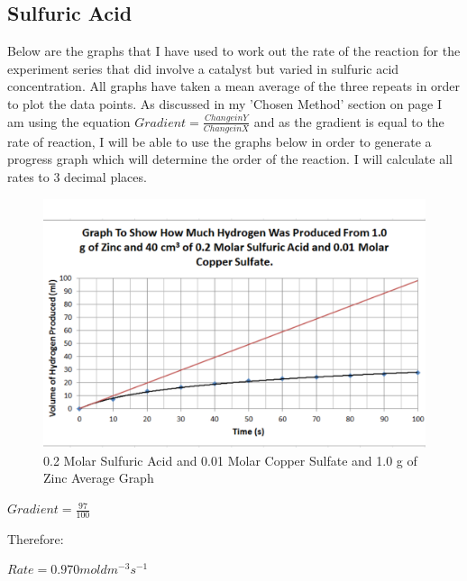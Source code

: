 	\subsection{Sulfuric Acid}

Below are the graphs that I have used to work out the rate of the reaction for the experiment series that did involve a catalyst but varied in sulfuric acid concentration. All graphs have taken a mean average of the three repeats in order to plot the data points. As discussed in my 'Chosen Method' section on page \pageref{Chosen Method} I am using the equation $Gradient = \frac{Change in Y}{Change in X}$ and as the gradient is equal to the rate of reaction, I will be able to use the graphs below in order to generate a progress graph which will determine the order of the reaction. I will calculate all rates to 3 decimal places.


\begin{figure}[H]
    \includegraphics[width=\textwidth]{./Analysis/Images/2Catalysed/02Molar.pdf}
    \caption{0.2 Molar Sulfuric Acid and 0.01 Molar Copper Sulfate and 1.0 g of Zinc Average Graph} \label{fig:02MolarSACSGradient}
\end{figure}

$Gradient = \frac{97}{100}$

Therefore:

$Rate = 0.970 mol dm^{-3} s^{-1}$

